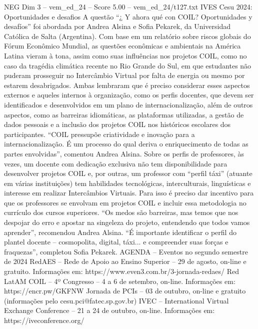 \begin{textsample}{NEG Dim 3 – vem\_ed\_24 – Score 5.00 – vem\_ed\_24/t127.txt}  \label{ex:f3_neg_103}
IVES Cesu 2024: Oportunidades e desafios A questão “¿ Y ahora qué con COIL?
Oportunidades y desafíos” foi abordada por Andrea Alsina e Sofia Pekarek, da Universidad Católica de Salta (Argentina).
Com base em um relatório sobre riscos globais do Fórum Econômico Mundial, as questões econômicas e ambientais na América Latina vieram à tona, assim como suas influências nos projetos COIL, como no caso da tragédia climática recente no Rio Grande do Sul, em que estudantes não puderam prosseguir no Intercâmbio Virtual por falta de energia ou mesmo por estarem desabrigados.
Ambas lembraram que é preciso considerar esses aspectos externos e aqueles internos à organização, como os perfis docentes, que devem ser identificados e desenvolvidos em um plano de internacionalização, além de outros aspectos, como as barreiras idiomáticas, as plataformas utilizadas, a gestão de dados pessoais e a inclusão dos projetos COIL nos históricos escolares dos participantes. “COIL pressupõe criatividade e inovação para a internacionalização.
É um processo do qual deriva o enriquecimento de todas as partes envolvidas”, comentou Andrea Alsina.
Sobre os perfis de professores, às vezes, um docente com dedicação exclusiva não tem disponibilidade para desenvolver projetos COIL e, por outras, um professor com “perfil táxi” (atuante em várias instituições) tem habilidades tecnológicas, interculturais, linguísticas e interesse em realizar Intercâmbios Virtuais.
Para isso é preciso dar incentivo para que os professores se envolvam em projetos COIL e incluir essa metodologia no currículo dos cursos superiores. “Os medos são barreiras, mas temos que nos despojar do erro e apostar na singeleza do projeto, entendendo que todos vamos aprender”, recomendou Andrea Alsina. “É importante identificar o perfil do plantel docente – cosmopolita, digital, táxi... e compreender suas forças e fraquezas”, completou Sofia Pekarek.
AGENDA – Eventos no segundo semestre de 2024 RedAES – Rede de Apoio ao Ensino Superior – 29 de agosto, on-line e gratuito.
Informações em: https://www.even3.com.br/3-jornada-redaes/ Red LatAM COIL – 4º Congresso – 4 a 6 de setembro, on-line.
Informações em: https://encr.pw/GKFNW Jornada de PCIs – 03 de outubro, on-line e gratuito (informações pelo cesu.pci@fatec.sp.gov.br) IVEC – International Virtual Exchange Conference – 21 a 24 de outubro, on-line.
Informações em: https://iveconference.org/

\end{textsample}
